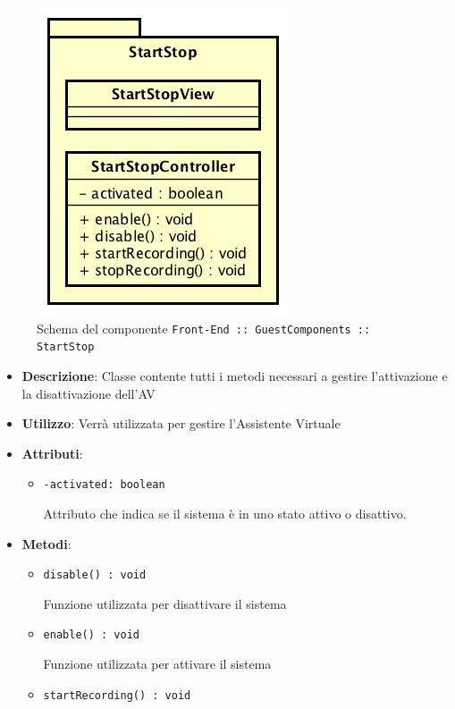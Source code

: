 \documentclass[../DefinizioneDiProdotto.tex]{subfiles}
\begin{document}
\begin{itemize}
	\begin{figure}[!h]
		\centering
		\includegraphics[scale=0.7]{Architettura/Front-End/GuestHome/Components/StartStop.png}
		\caption{Schema del componente \texttt{Front-End :: GuestComponents :: StartStop}}
	\end{figure}
	\begin{itemize}\item \textbf{Descrizione}: Classe contente tutti i metodi necessari a gestire l'attivazione e la disattivazione dell'AV
	\item \textbf{Utilizzo}: Verrà utilizzata per gestire l'Assistente Virtuale
	\item \textbf{Attributi}:
	\begin{itemize}
	\item \texttt{-activated: boolean}\

	 Attributo che indica se il sistema è in uno stato attivo o disattivo.
	\end{itemize}
	\item \textbf{Metodi}:
	\begin{itemize}
	\item \texttt{disable() : void}\

	 Funzione utilizzata per disattivare il sistema
	\end{itemize}\vspace{0.5em}
	\begin{itemize}
	\item \texttt{enable() : void}\

	 Funzione utilizzata per attivare il sistema
	\end{itemize}\vspace{0.5em}
	\begin{itemize}
	\item \texttt{startRecording() : void}\


\end{itemize}
\end{itemize}
\end{itemize}
\end{document}
